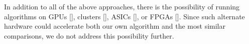 In addition to all of the above approaches, there is the possibility of running algorithms on GPUs [], clusters [], ASICs [], or FPGAs []. Since such alternate hardware could accelerate both our own algorithm and the most similar comparisons, we do not address this possibility further.












